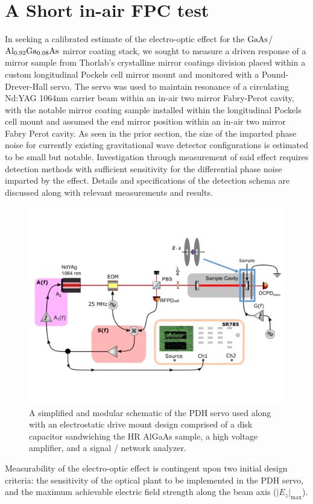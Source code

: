 \section{A Short in-air FPC test}
 In seeking a calibrated estimate of the electro-optic effect for the $\mathrm{GaAs}$/$\mathrm{Al_{0.92}Ga_{0.08}As}$ mirror coating stack, we sought to measure a driven response of a mirror sample from Thorlab's crystalline mirror coatings division placed within a custom longitudinal Pockels cell mirror mount and monitored with a Pound-Drever-Hall servo. The servo was used to maintain resonance of a circulating Nd:YAG 1064nm carrier beam within an in-air two mirror Fabry-Perot cavity, with the notable mirror coating sample installed within the longitudinal Pockels cell mount and assumed the end mirror position within an in-air two mirror Fabry Perot cavity. As seen in the prior section, the size of the imparted phase noise for currently existing gravitational wave detector configurations is estimated to be small but notable. Investigation through measurement of said effect requires detection methods with sufficient sensitivity for the differential phase noise imparted by the effect. Details and specifications of the detection schema are discussed along with relevant measurements and results. 

\begin{figure}[H]
	\includegraphics[width=\textwidth]{figs/ALGAAS/algaas_pockels_effect_measurement_schematic.pdf}
	\caption{A simplified and modular schematic of the PDH servo used along with an electrostatic drive mount design comprised of a disk capacitor sandwiching the HR AlGaAs sample, a high voltage amplifier, and a signal / network analyzer.}
\label{fig:simplified_experiment_schema}
\end{figure}
 Measurability of the electro-optic effect is contingent upon two initial design criteria: the sensitivity of the optical plant to be implemented in the PDH servo, and the maximum achievable electric field strength along the beam axis ($|E_z|_\mathrm{max}$).

